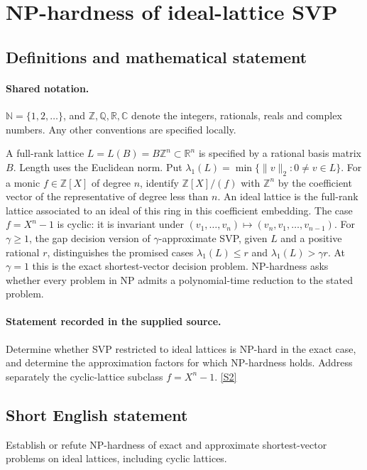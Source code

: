 \documentclass[11pt]{article}
\newcommand{\sref}[2]{\hyperlink{source:#1:#2}{[S#2]}}
\begin{document}
\section{NP-hardness of ideal-lattice SVP}\label{statement}

\subsection{Definitions and mathematical statement}

\paragraph{Shared notation.}$\mathbb N=\{1,2,\ldots\}$, and $\mathbb Z,\mathbb Q,\mathbb R,\mathbb C$ denote the integers, rationals, reals and complex numbers. Any other conventions are specified locally.


A full-rank lattice $L=L(B)=B\mathbb Z^n\subset\mathbb R^n$ is specified by a rational basis matrix $B$. Length uses the Euclidean norm. Put $\lambda_1(L)=\min\{\|v\|_2:0\ne v\in L\}$. For a monic $f\in\mathbb Z[X]$ of degree $n$, identify $\mathbb Z[X]/(f)$ with $\mathbb Z^n$ by the coefficient vector of the representative of degree less than $n$. An ideal lattice is the full-rank lattice associated to an ideal of this ring in this coefficient embedding. The case $f=X^n-1$ is cyclic: it is invariant under $(v_1,\ldots,v_n)\mapsto(v_n,v_1,\ldots,v_{n-1})$. For $\gamma\ge1$, the gap decision version of $\gamma$-approximate SVP, given $L$ and a positive rational $r$, distinguishes the promised cases $\lambda_1(L)\le r$ and $\lambda_1(L)>\gamma r$. At $\gamma=1$ this is the exact shortest-vector decision problem. NP-hardness asks whether every problem in NP admits a polynomial-time reduction to the stated problem.
\paragraph{Statement recorded in the supplied source.}
Determine whether SVP restricted to ideal lattices is NP-hard in the exact case, and determine the approximation factors for which NP-hardness holds. Address separately the cyclic-lattice subclass $f=X^n-1$. \sref{statement}{2}

\subsection{Short English statement}
Establish or refute NP-hardness of exact and approximate shortest-vector problems on ideal lattices, including cyclic lattices.
\end{document}
